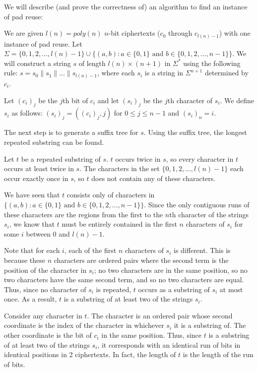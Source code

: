\documentclass[11pt]{article}
\begin{document}
We will describe (and prove the correctness of) an algorithm to find an instance of pad reuse:

We are given $l(n) = poly(n)$ $n$-bit ciphertexts ($c_0$ through $c_{l(n) -1}$) with one instance of pad reuse. Let $\Sigma=\{0,1,2,...,l(n)-1\}\cup \{(a,b) : a \in \{0,1\} \text{ and } b \in \{0,1,2,...,n-1\}\}$. We will construct a string $s$ of length $l(n)\times (n+1)$ in $\Sigma^*$ using the following rule: $s = s_0\|s_1\|...\|s_{l(n) -1}$, where each $s_i$ is a string in $\Sigma^{n+1}$ determined by $c_i$.

Let $(c_i)_j$ be the $j$th bit of $c_i$ and let $(s_i)_j$ be the $j$th character of $s_i$. We define $s_i$ as follows: $(s_i)_j = ((c_i)_j, j)$ for $0 \le j \le n-1$ and $(s_i)_n = i$.

The next step is to generate a suffix tree for $s$. Using the suffix tree, the longest repeated substring can be found. 

Let $t$ be a repeated substring of $s$. $t$ occurs twice in $s$, so every character in $t$ occurs at least twice in $s$. The characters in the set $\{0,1,2,...,l(n)-1\}$ each occur exactly once in $s$, so $t$ does not contain any of these characters.

We have seen that $t$ consists only of characters in $ \{(a,b) : a \in \{0,1\} \text{ and } b \in \{0,1,2,...,n-1\}\}$. Since the only contiguous runs of these characters are the regions from the first to the $n$th character of the strings $s_i$, we know that $t$ must be entirely contained in the first $n$ characters of $s_i$ for some $i$ between $0$ and $l(n)-1$. 

Note that for each $i$, each of the first $n$ characters of $s_i$ is different. This is because these $n$ characters are ordered pairs where the second term is the position of the character in $s_i$; no two characters are in the same position, so no two characters have the same second term, and so no two characters are equal. Thus, since no character of $s_i$ is repeated, $t$ occurs as a substring of $s_i$ at most once. As a result, $t$ is a substring of at least two of the strings $s_i$.

Consider any character in $t$. The character is an ordered pair whose second coordinate is the index of the character in whichever $s_i$ it is a substring of. The other coordinate is the bit of $c_i$ in the same position. Thus, since $t$ is a substring of at least two of the strings $s_i$, it corresponds with an identical run of bits in identical positions in 2 ciphertexts. In fact, the length of $t$ is the length of the run of bits. 
\end{document}
